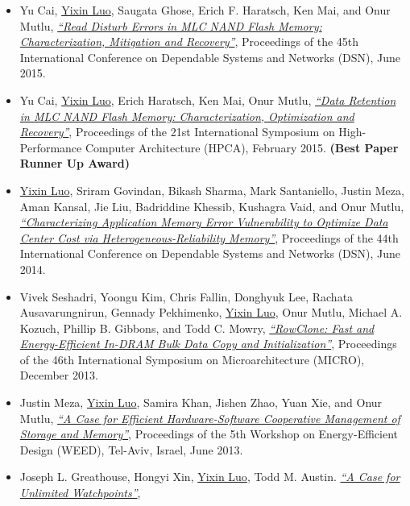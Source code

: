 \documentclass{res}
\begin{document}
\begin{resume}
\begin{itemize}[leftmargin=4mm]
  \item Yu Cai, \underline{Yixin Luo}, Saugata Ghose, Erich F. Haratsch, Ken Mai, and Onur Mutlu,
        \href{http://www.cs.cmu.edu/~yixinluo/index_files/read-disturb-errors_dsn15.pdf}{\em ``Read Disturb Errors in MLC NAND Flash Memory: Characterization, Mitigation and Recovery''},
        Proceedings of the 45th International Conference on Dependable Systems and Networks (DSN), June 2015.
  \item Yu Cai, \underline{Yixin Luo}, Erich Haratsch, Ken Mai, Onur Mutlu,
        \href{http://www.cs.cmu.edu/~yixinluo/index_files/flash-memory-data-retention_hpca15.pdf}{\em ``Data Retention in MLC NAND Flash Memory: Characterization, Optimization and Recovery''}, 
        Proceedings of the 21st International Symposium on High-Performance Computer Architecture (HPCA), February 2015. {\bf (Best Paper Runner Up Award)}
  \item \underline{Yixin Luo}, Sriram Govindan, Bikash Sharma, Mark Santaniello, Justin Meza, Aman Kansal, Jie Liu, Badriddine Khessib, Kushagra Vaid, and Onur Mutlu, 
        \href{http://www.cs.cmu.edu/~yixinluo/index_files/heterogeneous-reliability-memory_dsn14.pdf}{\em ``Characterizing Application Memory Error Vulnerability to Optimize Data Center Cost via Heterogeneous-Reliability Memory''},
        Proceedings of the 44th International Conference on Dependable Systems and Networks (DSN), June 2014.
  \item Vivek Seshadri, Yoongu Kim, Chris Fallin, Donghyuk Lee, Rachata Ausavarungnirun, Gennady Pekhimenko, \underline{Yixin Luo}, Onur Mutlu, Michael A. Kozuch, Phillip B. Gibbons, and Todd C. Mowry,
        \href{http://www.cs.cmu.edu/~yixinluo/index_files/rowclone_micro13.pdf}{\em ``RowClone: Fast and Energy-Efficient In-DRAM Bulk Data Copy and Initialization''},
        Proceedings of the 46th International Symposium on Microarchitecture (MICRO), December 2013.
  \item Justin Meza, \underline{Yixin Luo}, Samira Khan, Jishen Zhao, Yuan Xie, and Onur Mutlu,
        \href{http://www.cs.cmu.edu/~yixinluo/index_files/persistent-memory-management_weed13.pdf}{\em ``A Case for Efficient Hardware-Software Cooperative Management of Storage and Memory''},
        Proceedings of the 5th Workshop on Energy-Efficient Design (WEED), Tel-Aviv, Israel, June 2013.
  \item Joseph L. Greathouse, Hongyi Xin, \underline{Yixin Luo}, Todd M. Austin.
        \href{http://www.cs.cmu.edu/~yixinluo/index_files/unlimited-watchpoints_asplos12.pdf}{\em ``A Case for Unlimited Watchpoints''},

\end{itemize}
\end{resume}
\end{document}
